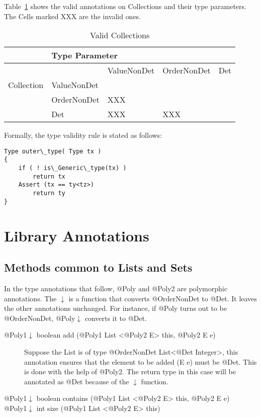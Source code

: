 Table~\ref{Tab:validity} shows the valid annotations on Collections and their type parameters. 
The Cells marked XXX are the invalid ones.
\begin{table}[h]
	\centering
	\caption{Valid Collections}
	\label{Tab:validity}
	\begin{tabular}{|l|l|l|l|l|}
		\hline
		& 		\multicolumn{4}{l|}{Type Parameter}		                                                                   \\ \hline
		&             & ValueNonDet                                     & OrderNonDet              & Det \\ \cline{2-5} 
		Collection    & ValueNonDet &                                                 &                          &     \\ \cline{2-5} 
		& OrderNonDet &   XXX  &                          &     \\ \cline{2-5} 
		& Det         &         XXX               &  	XXX	&     \\ \hline
	\end{tabular}
\end{table}

Formally, the type validity rule is stated as follows:

\begin{prooftree}
\end{prooftree}

\begin{verbatim}
Type outer\_type( Type tx )
{
    if ( ! is\_Generic\_type(tx) )
        return tx
    Assert (tx == ty<tz>)
        return ty
}
\end{verbatim}

\section{Library Annotations\label{library-Annotations}}
\subsection{Methods common to Lists and Sets\label{lib-methods}}
In the type annotations that follow, @Poly and @Poly2 are polymorphic annotations. The $\downarrow$ is a function
that converts @OrderNonDet to @Det. It leaves the other annotations unchanged. For instance, if @Poly turns out to be
@OrderNonDet, @Poly$\downarrow$ converts it to @Det. 
\begin{description}
	\item[@Poly1$\downarrow$  boolean add (@Poly1 List <@Poly2 E> this, @Poly2 E e)] Suppose the List is of
	type @OrderNonDet List<@Det Integer>, this annotation ensures that the element to be added (E e) must be @Det. This is
	done with the help of @Poly2. The return type in this case will be annotated as @Det because of the $\downarrow$ function.
	\item[@Poly1$\downarrow$  boolean contains (@Poly1 List <@Poly2 E> this, @Poly2 E e)] 
	\item[@Poly1$\downarrow$  int size (@Poly1 List <@Poly2 E> this)] 
\end{description}

